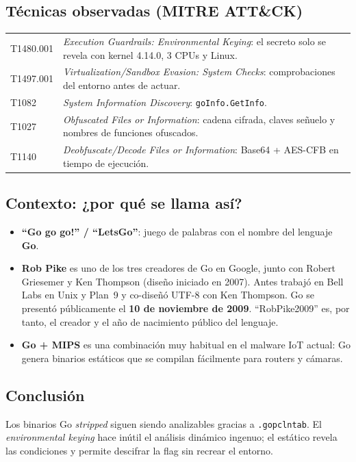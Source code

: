 \documentclass[11pt,a4paper]{article}
\begin{document}
\subsection{Técnicas observadas (MITRE ATT\&CK)}
\begin{tabularx}{\linewidth}{@{}lX@{}}
\toprule
T1480.001 & \emph{Execution Guardrails: Environmental Keying}: el secreto solo se revela con kernel 4.14.0, 3 CPUs y Linux. \\
T1497.001 & \emph{Virtualization/Sandbox Evasion: System Checks}: comprobaciones del entorno antes de actuar. \\
T1082 & \emph{System Information Discovery}: \texttt{goInfo.GetInfo}. \\
T1027 & \emph{Obfuscated Files or Information}: cadena cifrada, claves señuelo y nombres de funciones ofuscados. \\
T1140 & \emph{Deobfuscate/Decode Files or Information}: Base64 + AES-CFB en tiempo de ejecución. \\
\bottomrule
\end{tabularx}

\subsection{Contexto: ¿por qué se llama así?}
\begin{itemize}
  \item \textbf{``Go go go!'' / ``LetsGo''}: juego de palabras con el nombre del lenguaje \textbf{Go}.
  \item \textbf{Rob Pike} es uno de los tres creadores de Go en Google, junto con Robert Griesemer y Ken Thompson
        (diseño iniciado en 2007). Antes trabajó en Bell Labs en Unix y Plan~9 y co-diseñó UTF-8 con Ken Thompson.
        Go se presentó públicamente el \textbf{10 de noviembre de 2009}. ``RobPike2009'' es, por tanto, el creador y
        el año de nacimiento público del lenguaje.
  \item \textbf{Go + MIPS} es una combinación muy habitual en el malware IoT actual: Go genera binarios estáticos que se
        compilan fácilmente para routers y cámaras.
\end{itemize}

\subsection{Conclusión}
Los binarios Go \emph{stripped} siguen siendo analizables gracias a \texttt{.gopclntab}. El \emph{environmental
keying} hace inútil el análisis dinámico ingenuo; el estático revela las condiciones y permite descifrar la flag sin
recrear el entorno.
\end{document}
